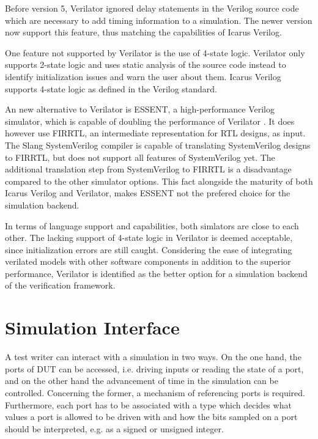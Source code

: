 Before version 5, Verilator ignored delay statements in the Verilog source code which are necessary to add timing
information to a simulation. The newer version now support this feature, thus matching the capabilities of Icarus Verilog.

One feature not supported by Verilator is the use of 4-state logic. Verilator only supports 2-state logic and uses
static analysis of the source code instead to identify initialization issues and warn the user about them. Icarus
Verilog supports 4-state logic as defined in the Verilog standard.

An new alternative to Verilator is ESSENT, a high-performance Verilog simulator, which is capable of doubling the
performance of Verilator \cite{beamer2021essent}. It does however use FIRRTL, an intermediate representation for RTL
designs, as input. The Slang SystemVerilog compiler \cite{slang} is capable of translating SystemVerilog designs to
FIRRTL, but does not support all features of SystemVerilog yet. The additional translation step from SystemVerilog to
FIRRTL is a disadvantage compared to the other simulator options. This fact alongside the maturity of both Icarus
Verilog and Verilator, makes ESSENT not the prefered choice for the simulation backend.

In terms of language support and capabilities, both simlators are close to each other. The lacking support of 4-state
logic in Verilator is deemed acceptable, since initialization errors are still caught. Considering the ease of
integrating verilated models with other software components in addition to the
superior performance, Verilator is identified as the better option for a simulation backend of the verification framework.


\section{Simulation Interface} %

A test writer can interact with a simulation in two ways. On the one hand, the ports of DUT can be accessed, i.e.
driving inputs or reading the state of a port, and on the other hand the advancement of time in the simulation can be
controlled. Concerning the former, a mechanism of referencing ports is required. Furthermore, each port has to be
associated with a type which decides what values a port is allowed to be driven with and how the bits sampled on a
port should be interpreted, e.g. as a signed or unsigned integer.

